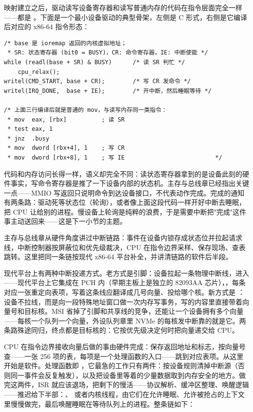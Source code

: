 映射建立之后，驱动读写设备寄存器和读写普通内存的代码在指令层面完全一样——都是 。下面是一个最小设备驱动的典型骨架，左侧是 C 形式，右侧是它编译后对应的 x86-64 指令形态：

\begin{lstlisting}
/* base 是 ioremap 返回的内核虚拟地址；
 * SR: 状态寄存器 (bit0 = BUSY)，CR: 命令寄存器，IE: 中断使能 */
while (readl(base + SR) & BUSY)      /* 读 SR 判忙 */
    cpu_relax();
writel(CMD_START, base + CR);        /* 写 CR 发命令 */
writel(IRQ_DONE,  base + IE);        /* 开中断，然后睡眠等待 */

/* 上面三行编译后就是普通的 mov，与读写内存同一类指令：
 * mov  eax, [rbx]          ; 读 SR
 * test eax, 1
 * jnz  .busy
 * mov  dword [rbx+4], 1    ; 写 CR
 * mov  dword [rbx+8], 1    ; 写 IE                          */
\end{lstlisting}

代码和内存访问长得一样，语义却完全不同：读状态寄存器拿到的是设备此刻的硬件事实，写命令寄存器是推了一下设备内部的状态机。主存与总线章已经指出关键一点——MMIO 写返回只说明命令到达设备接口，不代表动作完成。完成的通知有两条路：驱动死等状态位（轮询），或者像上面这段代码一样开好中断去睡眠，把 CPU 让给别的进程。慢设备上轮询是纯粹的浪费，于是需要中断把"完成"这件事主动送回来——这是下一小节的主题。


主存与总线章从硬件角度讲过中断链路：事件在设备内锁存成状态位并拉起请求线，中断控制器按屏蔽位和优先级裁决，CPU 在指令边界采样、保存现场、查表跳转。这里把同一条链按现代 x86-64 平台补全，并讲清链路的软件后半段。

现代平台上有两种中断投递方式。老方式是引脚：设备拉起一条物理中断线，进入 ——现代平台上它集成在 PCH 内（早期主板上是独立的 82093AA 芯片），，每条对应一张重定向表项，写着这条线应翻译成几号向量、投给哪个核。新方式是 ：设备不拉线，而是向一段特殊地址窗口做一次内存写事务，写的内容里直接带着向量号和目标核。MSI 省掉了引脚和共享线的竞争，还能让一个设备拥有多个向量——每核一个队列一个向量，外设队列章里 NVMe 的每核发中断靠的就是它。两条路殊途同归，终点都是目标核的：它按优先级决定何时把向量递交给 CPU。

CPU 在指令边界接收向量后做的事由硬件完成：保存返回地址和标志，按向量号查——一张 256 项的表，每项是一个处理函数的入口——跳到对应表项。从这里开始是软件。处理函数即 ，它最急的工作只有两件：按设备规则清掉中断源（否则同一事件会反复触发），以及把设备里等着的少量数据取到内存安全的地方。做完这两件，ISR 就应该退场，把剩下的慢活——协议解析、缓冲区整理、唤醒逻辑——推迟给下半部：、 或者内核线程，由它们在允许睡眠、允许被抢占的上下文里慢慢做完，最后唤醒睡眠在等待队列上的进程。整条链如下：

